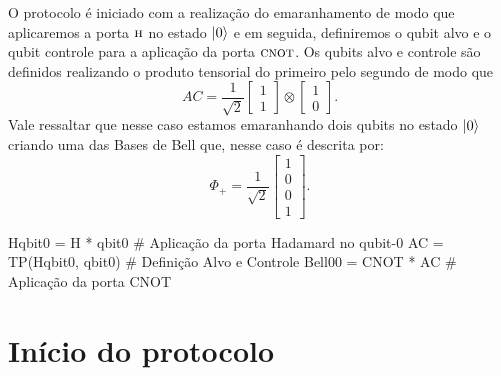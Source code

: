 O protocolo é iniciado com a realização do emaranhamento de modo que aplicaremos a porta \(\operatorname{\textsc{h}}\) no estado \(\ket{0}\) e em seguida, definiremos o qubit alvo e o qubit controle para a aplicação da porta \(\operatorname{\textsc{cnot}}\). Os qubits alvo e controle são definidos realizando o produto tensorial do primeiro pelo segundo de modo que
\[
  AC = \frac{1}{\sqrt{2}} \begin{bmatrix} 1 \\ 1 \end{bmatrix} \otimes \begin{bmatrix} 1 \\ 0 \end{bmatrix}.
\]
Vale ressaltar que nesse caso estamos emaranhando dois qubits no estado \(\ket{0}\) criando uma das Bases de Bell que, nesse caso é descrita por:
\[
  \Phi_+ = \frac{1}{\sqrt{2}} \begin{bmatrix} 1 \\ 0 \\ 0 \\ 1 \end{bmatrix}.
\]
\begin{pycode}
    Hqbit0 = H * qbit0      # Aplicação da porta Hadamard no qubit-0
    AC = TP(Hqbit0, qbit0)  # Definição Alvo e Controle
    Bell00 = CNOT * AC      # Aplicação da porta CNOT
\end{pycode}

\section{Início do protocolo}\label{protocolo}


